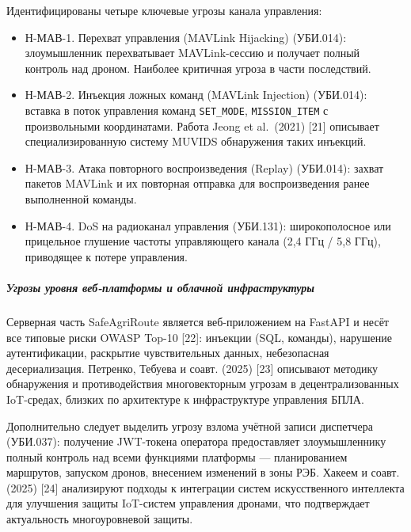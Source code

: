 \documentclass[14pt,a4paper]{extarticle}
\providecommand{\tightlist}{%
  \setlength{\itemsep}{0pt}\setlength{\parskip}{0pt}}
\begin{document}
Идентифицированы четыре ключевые угрозы канала управления:

\begin{itemize}
\tightlist
\item
  Н-МАВ-1. Перехват управления (MAVLink Hijacking) (УБИ.014): злоумышленник перехватывает MAVLink-сессию и получает полный контроль над дроном. Наиболее критичная угроза в части последствий.
\item
  Н-МАВ-2. Инъекция ложных команд (MAVLink Injection) (УБИ.014): вставка в поток управления команд \texttt{SET\_MODE}, \texttt{MISSION\_ITEM} с произвольными координатами. Работа Jeong et al.~(2021) {[}21{]} описывает специализированную систему MUVIDS обнаружения таких инъекций.
\item
  Н-МАВ-3. Атака повторного воспроизведения (Replay) (УБИ.014): захват пакетов MAVLink и их повторная отправка для воспроизведения ранее выполненной команды.
\item
  Н-МАВ-4. DoS на радиоканал управления (УБИ.131): широкополосное или прицельное глушение частоты управляющего канала (2,4 ГГц / 5,8 ГГц), приводящее к потере управления.
\end{itemize}

\hypertarget{ux443ux433ux440ux43eux437ux44b-ux443ux440ux43eux432ux43dux44f-ux432ux435ux431-ux43fux43bux430ux442ux444ux43eux440ux43cux44b-ux438-ux43eux431ux43bux430ux447ux43dux43eux439-ux438ux43dux444ux440ux430ux441ux442ux440ux443ux43aux442ux443ux440ux44b}{%
\subparagraph{Угрозы уровня веб-платформы и облачной инфраструктуры}\label{ux443ux433ux440ux43eux437ux44b-ux443ux440ux43eux432ux43dux44f-ux432ux435ux431-ux43fux43bux430ux442ux444ux43eux440ux43cux44b-ux438-ux43eux431ux43bux430ux447ux43dux43eux439-ux438ux43dux444ux440ux430ux441ux442ux440ux443ux43aux442ux443ux440ux44b}}

Серверная часть SafeAgriRoute является веб-приложением на FastAPI и несёт все типовые риски OWASP Top-10 {[}22{]}: инъекции (SQL, команды), нарушение аутентификации, раскрытие чувствительных данных, небезопасная десериализация. Петренко, Тебуева и соавт. (2025) {[}23{]} описывают методику обнаружения и противодействия многовекторным угрозам в децентрализованных IoT-средах, близких по архитектуре к инфраструктуре управления БПЛА.

Дополнительно следует выделить угрозу взлома учётной записи диспетчера (УБИ.037): получение JWT-токена оператора предоставляет злоумышленнику полный контроль над всеми функциями платформы --- планированием маршрутов, запуском дронов, внесением изменений в зоны РЭБ. Хакеем и соавт. (2025) {[}24{]} анализируют подходы к интеграции систем искусственного интеллекта для улучшения защиты IoT-систем управления дронами, что подтверждает актуальность многоуровневой защиты.
\end{document}
